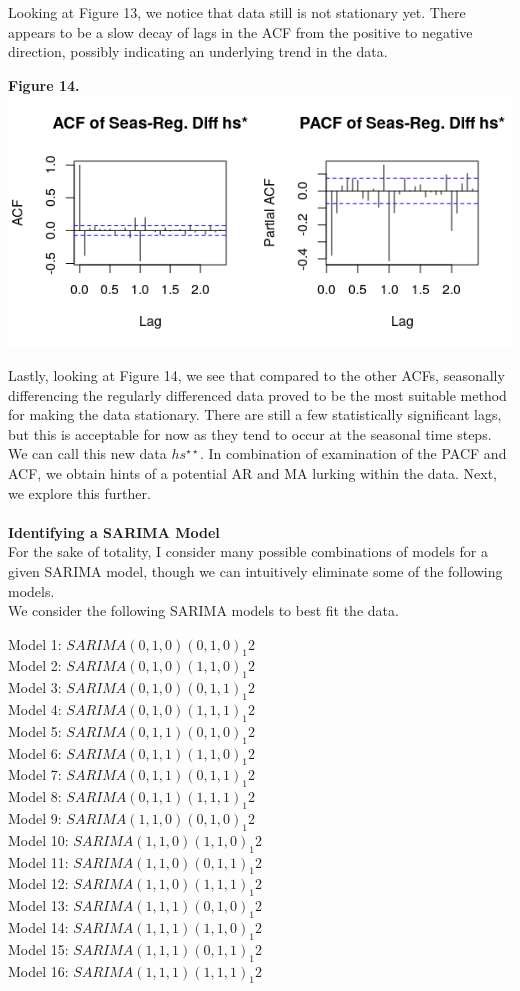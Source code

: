 \documentclass[11pt]{article}
\begin{document}
Looking at Figure 13, we notice that data still is not stationary yet. There appears to be a slow decay of lags in the ACF from the positive to negative direction, possibly indicating an underlying trend in the data.
\begin{center}
\textbf{Figure 14.}
\\
\includegraphics[scale=1]{acf-seas-reg}
\end{center}
Lastly, looking at Figure 14, we see that compared to the other ACFs, seasonally differencing the regularly differenced data proved to be the most suitable method for making the data stationary. There are still a few statistically significant lags, but this is acceptable for now as they tend to occur at the seasonal time steps. We can call this new data $hs^{\star\star}$. In combination of examination of the PACF and ACF, we obtain hints of a potential AR and MA lurking within the data. Next, we explore this further.
\\\\
\textbf{Identifying a SARIMA Model}
\\
For the sake of totality, I consider many possible combinations of models for a given SARIMA model, though we can intuitively eliminate some of the following models.
\\
We consider the following SARIMA models to best fit the data. 
\begin{center}
Model 1: $SARIMA(0,1,0)(0,1,0)_1 2$ \\
Model 2: $SARIMA(0,1,0)(1,1,0)_1 2$ \\
Model 3: $SARIMA(0,1,0)(0,1,1)_1 2$ \\
Model 4: $SARIMA(0,1,0)(1,1,1)_1 2$ \\
Model 5: $SARIMA(0,1,1)(0,1,0)_1 2$ \\
Model 6: $SARIMA(0,1,1)(1,1,0)_1 2$ \\
Model 7: $SARIMA(0,1,1)(0,1,1)_1 2$ \\
Model 8: $SARIMA(0,1,1)(1,1,1)_1 2$ \\
Model 9: $SARIMA(1,1,0)(0,1,0)_1 2$ \\
Model 10: $SARIMA(1,1,0)(1,1,0)_1 2$ \\
Model 11: $SARIMA(1,1,0)(0,1,1)_1 2$ \\
Model 12: $SARIMA(1,1,0)(1,1,1)_1 2$ \\
Model 13: $SARIMA(1,1,1)(0,1,0)_1 2$ \\
Model 14: $SARIMA(1,1,1)(1,1,0)_1 2$ \\
Model 15: $SARIMA(1,1,1)(0,1,1)_1 2$ \\
Model 16: $SARIMA(1,1,1)(1,1,1)_1 2$ 
\end{center}
\end{document}
